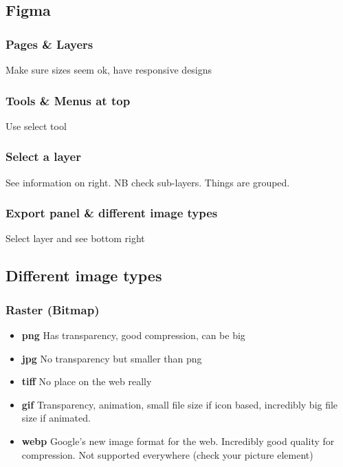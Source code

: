 \subsection{Figma}


\subsubsection{Pages \& Layers}

Make sure sizes seem ok, have responsive designs

\subsubsection{Tools \& Menus at top}

Use select tool

\subsubsection{Select a layer}

See information on right. NB check sub-layers. Things are grouped.

\subsubsection{Export panel \& different image types}

Select layer and see bottom right

\subsection{Different image types}

\subsubsection{Raster (Bitmap)}

\begin{itemize}
    \item \textbf{png} Has transparency, good compression, can be big
    \item \textbf{jpg} No transparency but smaller than png
    \item \textbf{tiff} No place on the web really
    \item \textbf{gif} Transparency, animation, small file size if icon based, incredibly big file size if animated.
    \item \textbf{webp} Google's new image format for the web. Incredibly good quality for compression. Not supported everywhere (check your picture element)
\end{itemize}


